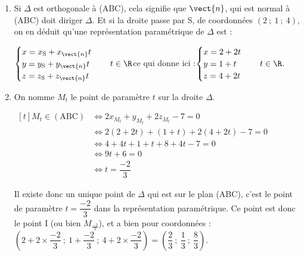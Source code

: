 \begin{enumerate}
\begin{enumerate}
	De plus, $\begin{aligned}[t] \mathrm{A} \in (\mathrm{ABC}) &\iff 2x_{\mathrm{A}} + y_{\mathrm{A}} + 2z_{\mathrm{A}} + d = 0\\
	&\iff 2\times 3 + (-1) + 2\times 1 + d = 0\\
	&\iff 6 - 1 + 2 + d = 0\\
	&\iff d = -7\end{aligned}$

	Finalement, une équation de (ABC) est :\quad$2x + y + 2z - 7 = 0$.

	\item Si $\Delta$ est orthogonale à (ABC), cela signifie que $\vect{n}$, qui est normal à (ABC) doit diriger $\Delta$. Et si la droite passe par S, de coordonnées $(2 ~;~ 1 ~;~ 4)$, on en déduit qu'une représentation paramétrique de $\Delta$ est :

	$\begin{cases}x = x_{\mathrm{S}} + x_{\vect{n}}t\\y = y_{\mathrm{S}} + y_{\vect{n}}t\\z = z_{\mathrm{S}} + z_{\vect{n}}t\\	\end{cases} \quad t \in \R$\quad ce qui donne ici :\quad $\begin{cases}x  = 2 + 2t\\y=1+t\\z=4+2t\end{cases} \quad t \in \R$.

	\item On nomme $M_t$ le point de paramètre $t$ sur la droite $\Delta$.

	$\begin{aligned}[t] M_t \in (\mathrm{ABC}) &\iff 2x_{M_{t}} + y_{M_{t}} + 2z_{M_{t}} - 7 = 0\\
	&\iff 2(2 + 2t) + (1 + t) + 2(4 + 2t) - 7 = 0\\
	&\iff 4 + 4t + 1 + t + 8 + 4t - 7 = 0\\
	&\iff 9t + 6 = 0\\
	&\iff t = \dfrac{-2}{3}\end{aligned}$

	Il existe donc un unique point de $\Delta$ qui est sur le plan (ABC), c'est le point de paramètre $t=\dfrac{-2}{3}$ dans la représentation paramétrique. Ce point est donc le point I (ou bien $M_{\frac{-2}{3}}$), et a bien pour coordonnées : $\left(2 + 2\times \dfrac{-2}{3} ~;~ 1 + \dfrac{-2}{3}~;~ 4 + 2\times \dfrac{-2}{3}\right)  = \left(\dfrac{2}{3} ~;~ \dfrac{1}{3} ~;~ \dfrac{8}{3}\right)$.


\end{enumerate}
\end{enumerate}
